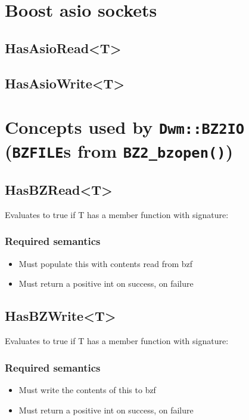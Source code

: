 \section{Boost asio sockets}
\hypertarget{concept:HasAsioRead}{\subsection{\ttfamily HasAsioRead<T>}}
\hypertarget{concept:HasAsioWrite}{\subsection{\ttfamily HasAsioWrite<T>}}

\begin{minipage}{\textwidth}
\section{Concepts used by \texttt{Dwm::BZ2IO} (\texttt{BZFILE}s from \texttt{BZ2\_bzopen()})}
\hypertarget{concept:HasBZRead}{\subsection{\ttfamily HasBZRead<T>}}
Evaluates to true if {\ttfamily T} has a member function with signature:


\subsubsection{Required semantics}
\begin{itemize}[noitemsep,nolistsep]
  \item Must populate {\ttfamily *this} with contents read from {\ttfamily bzf}
  \item Must return a positive {\ttfamily int} on success, {}
    on failure
\end{itemize}

\hypertarget{concept:HasBZWrite}{\subsection{\ttfamily HasBZWrite<T>}}
Evaluates to true if {\ttfamily T} has a member function with signature:


\subsubsection{Required semantics}
\begin{itemize}[noitemsep,nolistsep]
\item Must write the contents of {\ttfamily *this} to {\ttfamily bzf}
\item Must return a positive {\ttfamily int} on success, {}
  on failure
\end{itemize}


\end{minipage}
